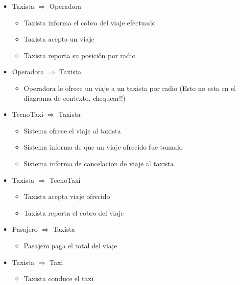 \begin{itemize}
\begin{itemize}
        \end{itemize}

        \item Taxista $\Rightarrow$ Operadora
  	 	 \begin{itemize}
        \item Taxista informa el cobro del viaje efectuado
        \item Taxista acepta un viaje
        \item Taxista reporta su posici\'on por radio
        
        \end{itemize}

         \item Operadora $\Rightarrow$ Taxista
       \begin{itemize}
        \item Operadora le ofrece un viaje a un taxista por radio (Esto no esta en el diagrama de contexto, chequear!!)
        
        \end{itemize}


    \item TecnoTaxi $\Rightarrow$ Taxista
    \begin{itemize}
        \item Sistema ofrece el viaje al taxista
        \item Sistema informa de que un viaje ofrecido fue tomado
        \item Sistema informa de cancelacion de viaje al taxista
    \end{itemize}

    \item Taxista $\Rightarrow$ TecnoTaxi
    \begin{itemize}
         \item Taxista acepta viaje ofrecido
         \item Taxista reporta el cobro del viaje
         \end{itemize}

         \item Pasajero $\Rightarrow$ Taxista
    \begin{itemize}
         \item Pasajero paga el total del viaje
    \end{itemize}

   \item Taxista $\Rightarrow$ Taxi 
    \begin{itemize}
         \item Taxista conduce el taxi
    \end{itemize}



\end{itemize}
